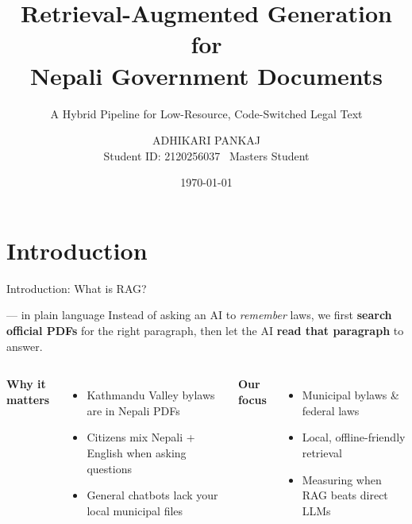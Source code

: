 \documentclass[11pt,aspectratio=169]{beamer}
\title[RAG for Nepali Gov Docs]{Retrieval-Augmented Generation for\\Nepali Government Documents}
\subtitle{A Hybrid Pipeline for Low-Resource, Code-Switched Legal Text}
\author[Adhikari Pankaj]{ADHIKARI PANKAJ\\[0.2cm]\small Student ID: 2120256037 \textbullet\ Masters Student}
\institute[Nankai University]{Nankai University}
\date{\today}
\begin{document}
\begin{frame}
  \titlepage
\end{frame}

\section{Introduction}
\begin{frame}{Introduction: What is RAG?}
  \begin{block}{ — in plain language}
    Instead of asking an AI to \emph{remember} laws, we first \textbf{search official PDFs} for the right paragraph, then let the AI \textbf{read that paragraph} to answer.
  \end{block}
  \vspace{0.25cm}
  \begin{columns}[T]
    \textbf{Why it matters}
    \begin{itemize}
      \item Kathmandu Valley bylaws are in Nepali PDFs
      \item Citizens mix Nepali + English when asking questions
      \item General chatbots lack your local municipal files
    \end{itemize}
    \textbf{Our focus}
    \begin{itemize}
      \item Municipal bylaws \& federal laws
      \item Local, offline-friendly retrieval
      \item Measuring when RAG beats direct LLMs
    \end{itemize}
  \end{columns}
\end{frame}

\end{document}
